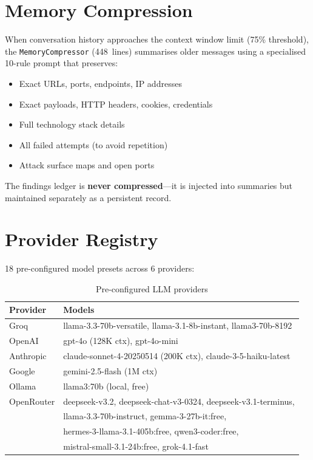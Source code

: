 \documentclass[12pt,a4paper]{report}
\begin{document}
\section{Memory Compression}
When conversation history approaches the context window limit (75\% threshold),
the \texttt{MemoryCompressor} (448~lines) summarises older messages using a
specialised 10-rule prompt that preserves:
\begin{itemize}[noitemsep]
  \item Exact URLs, ports, endpoints, IP addresses
  \item Exact payloads, HTTP headers, cookies, credentials
  \item Full technology stack details
  \item All failed attempts (to avoid repetition)
  \item Attack surface maps and open ports
\end{itemize}

The findings ledger is \textbf{never compressed}---it is injected into summaries
but maintained separately as a persistent record.

\section{Provider Registry}
18 pre-configured model presets across 6 providers:

\begin{table}[H]
\centering
\caption{Pre-configured LLM providers}
\label{tab:providers}
\begin{tabularx}{\textwidth}{lX}
\toprule
\textbf{Provider} & \textbf{Models} \\
\midrule
Groq       & llama-3.3-70b-versatile, llama-3.1-8b-instant, llama3-70b-8192 \\
OpenAI     & gpt-4o (128K ctx), gpt-4o-mini \\
Anthropic  & claude-sonnet-4-20250514 (200K ctx), claude-3-5-haiku-latest \\
Google     & gemini-2.5-flash (1M ctx) \\
Ollama     & llama3:70b (local, free) \\
OpenRouter & deepseek-v3.2, deepseek-chat-v3-0324, deepseek-v3.1-terminus, \\
           & llama-3.3-70b-instruct, gemma-3-27b-it:free, \\
           & hermes-3-llama-3.1-405b:free, qwen3-coder:free, \\
           & mistral-small-3.1-24b:free, grok-4.1-fast \\
\bottomrule
\end{tabularx}
\end{table}
\end{document}
